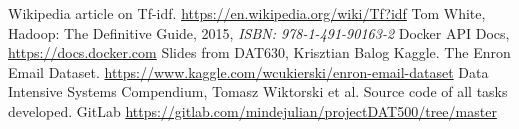 \documentclass[runningheads,a4paper]{llncs}
\begin{document}
\begin{thebibliography}{7}

 Wikipedia article on Tf-idf. \url{https://en.wikipedia.org/wiki/Tf?idf}
 Tom White, Hadoop: The Definitive Guide, 2015, \emph{ISBN: 978-1-491-90163-2}
 Docker API Docs, \url{https://docs.docker.com}
 Slides from DAT630, Krisztian Balog
 Kaggle. The Enron Email Dataset. \url{https://www.kaggle.com/wcukierski/enron-email-dataset}
 Data Intensive Systems Compendium, Tomasz Wiktorski et al.
 Source code of all tasks developed. GitLab \url{https://gitlab.com/mindejulian/projectDAT500/tree/master}

\end{thebibliography}
\end{document}

